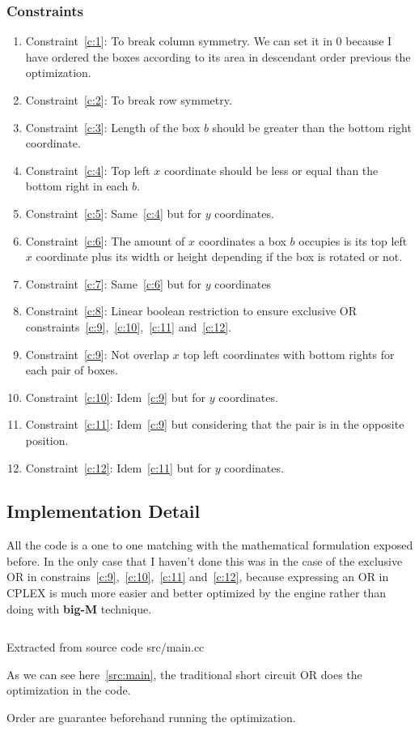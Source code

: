 \documentclass[12pt, a4paper]{article}
\begin{document}
\subsubsection{Constraints}
\begin{enumerate}

  \item Constraint~\ref{c:1}: To break column symmetry. We can set it in $0$ because I have ordered the boxes according to its area in descendant order previous the optimization.
  \item Constraint~\ref{c:2}: To break row symmetry.
  \item Constraint~\ref{c:3}: Length of the box $b$ should be greater than the bottom right coordinate.
  \item Constraint~\ref{c:4}: Top left $x$ coordinate should be less or equal than the bottom right in each $b$.
  \item Constraint~\ref{c:5}: Same~\ref{c:4} but for $y$ coordinates.
  \item Constraint~\ref{c:6}: The amount of $x$ coordinates a box $b$ occupies is its top left $x$ coordinate plus its width or height depending if the box is rotated or not.
  \item Constraint~\ref{c:7}: Same~\ref{c:6} but for $y$ coordinates
  \item Constraint~\ref{c:8}: Linear boolean restriction to ensure exclusive OR constraints~\ref{c:9},~\ref{c:10},~\ref{c:11} and~\ref{c:12}.
  \item Constraint~\ref{c:9}: Not overlap $x$ top left coordinates with bottom rights for each pair of boxes.
  \item Constraint~\ref{c:10}: Idem~\ref{c:9} but for $y$ coordinates.
  \item Constraint~\ref{c:11}: Idem~\ref{c:9} but considering that the pair is in the opposite position.
  \item Constraint~\ref{c:12}: Idem~\ref{c:11} but for $y$ coordinates.
\end{enumerate}

\subsection{Implementation Detail}
All the code is a one to one matching with the mathematical formulation exposed before. In the only case that I haven't done this was in the case of the exclusive OR in constrains~\ref{c:9},~\ref{c:10},~\ref{c:11} and~\ref{c:12}, because expressing an OR in CPLEX is much more easier and better optimized by the engine rather than doing with \textbf{big-M} technique.

\begin{listing}[H]
  \inputminted[firstline=75, lastline=85, breaklines]{cpp}{../src/main.cc}
  \caption{Extracted from source code src/main.cc}
  \label{src:main}
\end{listing}

As we can see here~\ref{src:main}, the traditional short circuit OR does the optimization in the code.

Order are guarantee beforehand running the optimization.
\end{document}
